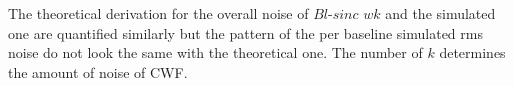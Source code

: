 \documentclass[useAMS,usenatbib]{mn2e}
\begin{document}
The theoretical derivation for the overall noise of $Bl$-$sinc$ $wk$ and the simulated one are quantified similarly but the pattern of the  
per baseline simulated rms noise do not look the same with the theoretical one. The number of $k$ determines the amount of noise  of CWF.
% 	  
% 	  
% 	  
%   
%     
% 	  
% 	  
\end{document}

